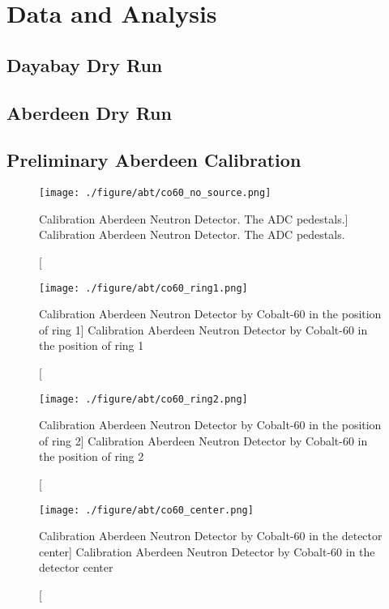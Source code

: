 \chapter {Data and Analysis}
\section {Dayabay Dry Run}
\section {Aberdeen Dry Run}
\section {Preliminary Aberdeen Calibration}

\begin{figure}
    \centering
    \texttt{[image: ./figure/abt/co60\_no\_source.png]}
    \caption
    [Calibration Aberdeen Neutron Detector. The ADC pedestals.]
    {Calibration Aberdeen Neutron Detector. The ADC pedestals.}
    \label{fig:co60_no_source.png}
    \end{figure}


\begin{figure}
    \centering
    \texttt{[image: ./figure/abt/co60\_ring1.png]}
    \caption
    [Calibration Aberdeen Neutron Detector by Cobalt-60 in the position of ring 1]
    {Calibration Aberdeen Neutron Detector by Cobalt-60 in the position of ring 1}
    \label{fig:co60_ring1.png}
    \end{figure}

\begin{figure}
    \centering
    \texttt{[image: ./figure/abt/co60\_ring2.png]}
    \caption
    [Calibration Aberdeen Neutron Detector by Cobalt-60 in the position of ring 2]
    {Calibration Aberdeen Neutron Detector by Cobalt-60 in the position of ring 2}
    \label{fig:co60_ring2.png}
    \end{figure}


\begin{figure}
    \centering
    \texttt{[image: ./figure/abt/co60\_center.png]}
    \caption
    [Calibration Aberdeen Neutron Detector by Cobalt-60 in the detector center]
    {Calibration Aberdeen Neutron Detector by Cobalt-60 in the detector center}
    \label{fig:co60_ring1.png}
    \end{figure}






